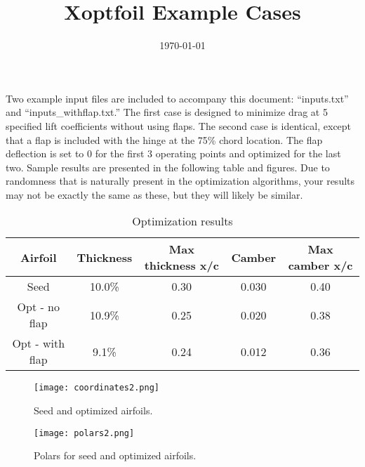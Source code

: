 \documentclass[11pt]{article}
\begin{document}
\title{Xoptfoil Example Cases}
\date{\today}
\maketitle

Two example input files are included to accompany this document: ``inputs.txt'' and
``inputs\_withflap.txt.'' The first case is designed to minimize drag at 5 specified lift
coefficients without using flaps. The second case is identical, except that a flap is
included with the hinge at the 75\% chord location. The flap deflection is set to 0 for
the first 3 operating points and optimized for the last two. Sample results are presented
in the following table and figures.
Due to randomness that is naturally present in the optimization algorithms, your
results may not be exactly the same as these, but they will likely be similar.

\begin{table}[!ht]
\centering
\caption{Optimization results}
\begin{tabular}{c c c c c} \\ \hline\hline
Airfoil         & Thickness & Max thickness x/c & Camber & Max camber x/c \\ \hline
Seed            & 10.0\%    & 0.30              & 0.030  & 0.40           \\
Opt - no flap   & 10.9\%    & 0.25              & 0.020  & 0.38           \\
Opt - with flap & 9.1\%     & 0.24              & 0.012  & 0.36           \\
\end{tabular}
\label{table:results}
\end{table}

\begin{figure}[!h]
\centering
  \texttt{[image: coordinates2.png]}
\caption{Seed and optimized airfoils.}
\label{fig:airfoils}
\end{figure}

\begin{figure}
\centering
  \texttt{[image: polars2.png]}
\caption{Polars for seed and optimized airfoils.}
\label{fig:polars}
\end{figure}
\end{document}
